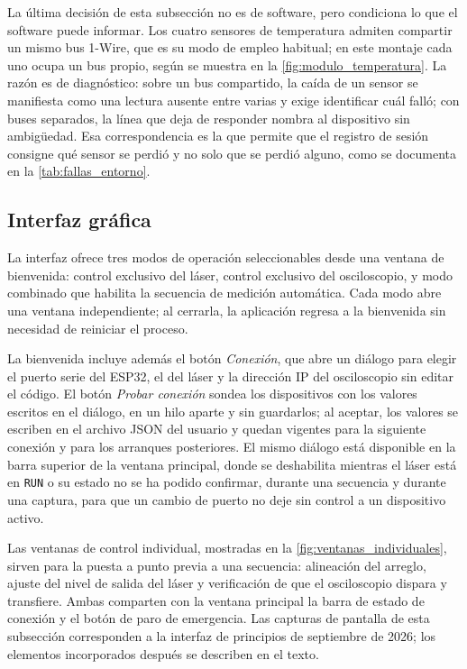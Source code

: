 La última decisión de esta subsección no es de software, pero condiciona
lo que el software puede informar. Los cuatro sensores de temperatura
admiten compartir un mismo bus 1-Wire, que es su modo de empleo
habitual; en este montaje cada uno ocupa un bus propio, según se muestra
en la \cref{fig:modulo_temperatura}. La razón es de diagnóstico: sobre
un bus compartido, la caída de un sensor se manifiesta como una lectura
ausente entre varias y exige identificar cuál falló; con buses
separados, la línea que deja de responder nombra al dispositivo sin
ambigüedad. Esa correspondencia es la que permite que el registro de
sesión consigne qué sensor se perdió y no solo que se perdió alguno,
como se documenta en la \cref{tab:fallas_entorno}.

\subsection{Interfaz gráfica}
\label{sec:gui}

La interfaz ofrece tres modos de operación seleccionables desde una
ventana de bienvenida: control exclusivo del láser, control exclusivo
del osciloscopio, y modo combinado que habilita la secuencia de
medición automática. Cada modo abre una ventana independiente; al
cerrarla, la aplicación regresa a la bienvenida sin necesidad de
reiniciar el proceso.

La bienvenida incluye además el botón \textit{Conexión}, que abre un
diálogo para elegir el puerto serie del ESP32, el del láser y la
dirección IP del osciloscopio sin editar el código. El botón
\textit{Probar conexión} sondea los dispositivos con los valores
escritos en el diálogo, en un hilo aparte y sin guardarlos; al aceptar,
los valores se escriben en el archivo JSON del usuario y quedan
vigentes para la siguiente conexión y para los arranques posteriores.
El mismo diálogo está disponible en la barra superior de la ventana
principal, donde se deshabilita mientras el láser está en
\texttt{RUN} o su estado no se ha podido confirmar, durante una
secuencia y durante una captura, para que un cambio de puerto no deje
sin control a un dispositivo activo.

Las ventanas de control individual, mostradas en la
\cref{fig:ventanas_individuales}, sirven para la puesta a punto previa
a una secuencia: alineación del arreglo, ajuste del nivel de salida del
láser y verificación de que el osciloscopio dispara y transfiere. Ambas
comparten con la ventana principal la barra de estado de conexión y el
botón de paro de emergencia. Las capturas de pantalla de esta
subsección corresponden a la interfaz de principios de septiembre de
2026; los elementos incorporados después se describen en el texto.

